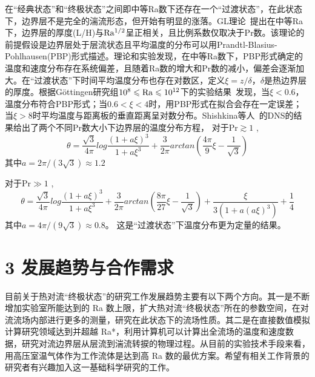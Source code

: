 \documentclass[10pt,aps]{article}
\def\be{\begin{equation}}
\def\ee{\end{equation}}
\begin{document}
{\vskip 6pt

在“经典状态”和“终极状态”之间即中等Ra数下还存在一个“过渡状态”，在此状态下，边界层不是完全的湍流形态，但开始有明显的涨落。GL理论~\cite{GL00}\cite{SPGL13}提出在中等Ra下，边界层的厚度(L/H)与$\rm Ra^{1/2}$呈正相关，且比例系数仅取决于Pr数。该理论的前提假设是边界层处于层流状态且平均温度的分布可以用Prandtl-Blasius-Pohlhausen(PBP)形式描述。理论和实验发现，在中等Ra数下，PBP形式确定的温度和速度分布存在系统偏差，且随着Ra数的增大和Pr数的减小，偏差会逐渐加大。在“过渡状态”下时间平均温度分布也存在对数区，定义$\xi=z/\delta$，$\delta$是热边界层的厚度。根据G\"ottingen研究组$10^8\leqslant \rm Ra\leqslant10^{12}$下的实验结果~\cite{WHT16}发现，当$\xi<0.6$，温度分布符合PBP形式；当$0.6<\xi<4$时，用PBP形式在拟合会存在一定误差；当$\xi>8$时平均温度与距离板的垂直距离呈对数分布。Shishkina等人~\cite{SHWC15}的DNS的结果给出了两个不同Pr数大小下边界层的温度分布方程，
对于Pr$\gtrsim 1$ ,
\be
\theta=\frac{\sqrt3}{4\pi}log\frac{(1+a\xi)^3}{1+{a\xi}^3}+\frac{3}{2\pi}arctan(\frac{4\pi}{9}\xi-\frac{1}{\sqrt3})
\ee
其中$a=2\pi/(3\sqrt3)\approx1.2$

对于Pr$\gg1$ ,
\be
\theta=\frac{\sqrt3}{4\pi}log\frac{(1+a\xi)^3}{1+{a\xi}^3}+\frac{3}{2\pi}arctan(\frac{8\pi}{27}\xi-\frac{1}{\sqrt3})+\frac{\xi}{3(1+a(a\xi)^3)}+\frac{1}{4}
\ee
其中$a=4\pi/(9\sqrt{3})\approx0.8$。
这是“过渡状态”下温度分布更为定量的结果。





\section*{3 发展趋势与合作需求}

目前关于热对流“终极状态”的研究工作发展趋势主要有以下两个方向。其一是不断增加实验室所能达到的 Ra 数上限，扩大热对流“终极状态”所在的参数空间，在对流流场内部进行更多的测量，研究在此状态下的流场性质。其二是在直接数值模拟计算研究领域达到并超越 Ra*，利用计算机可以计算出全流场的温度和速度数据，研究对流边界层从层流到湍流转捩的物理过程。从目前的实验技术手段来看，用高压室温气体作为工作流体是达到高 Ra 数的最优方案。希望有相关工作背景的研究者有兴趣加入这一基础科学研究的工作。








}
\end{document}
